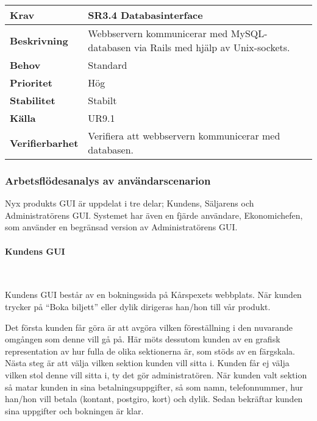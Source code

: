 \documentclass[a4paper, twoside, 11pt, titlepage]{article}
\begin{document}
		\begin {table} [ht] \begin{tabular} { p{2.6cm} p{12.5cm} }
			\hline
			\sffamily\textbf{Krav} & \sffamily\textbf{SR3.4 Databasinterface } \\
			\hline
			\sffamily\textbf{Beskrivning} & Webbservern kommunicerar med MySQL-databasen via Rails med hjälp av Unix-sockets.  \\
			\hline
			\sffamily\textbf{Behov} & Standard  \\
			\hline
			\sffamily\textbf{Prioritet} & Hög  \\
			\hline
			\sffamily\textbf{Stabilitet} & Stabilt  \\
			\hline
			\sffamily\textbf{Källa} & UR9.1  \\
			\hline
			\sffamily\textbf{Verifierbarhet} & Verifiera att webbservern kommunicerar med databasen.  \\
			\hline
		\end{tabular} \end{table} \FloatBarrier


		\subsubsection{Arbetsflödesanalys av användarscenarion}


		Nyx produkts GUI är uppdelat i tre delar; Kundens, Säljarens och Administratörens GUI. Systemet har även en fjärde användare, Ekonomichefen, som använder en begränsad version av Administratörens GUI.

			\paragraph{Kundens GUI}\

			Kundens GUI består av en bokningssida på Kårspexets webbplats. När kunden trycker på ``Boka biljett'' eller dylik dirigeras han/hon till vår produkt. 

			Det första kunden får göra är att avgöra vilken föreställning i den nuvarande omgången som denne vill gå på. Här möts dessutom kunden av en grafisk representation av hur fulla de olika sektionerna är, som stöds av en färgskala. Nästa steg är att välja vilken sektion kunden vill sitta i. Kunden får ej välja vilken stol denne vill sitta i, ty det gör administratören. När kunden valt sektion så matar kunden in sina betalningsuppgifter, så som namn, telefonnummer, hur han/hon vill betala (kontant, postgiro, kort) och dylik. Sedan bekräftar kunden sina uppgifter och bokningen är klar.
\end{document}
